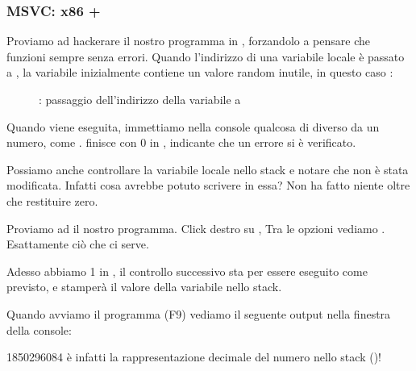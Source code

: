 \clearpage
\subsubsection{MSVC: x86 + \olly}

Proviamo ad hackerare il nostro programma in \olly, forzandolo a pensare che \scanf funzioni sempre senza errori.
Quando l'indirizzo di una variabile locale è passato a \scanf, la variabile inizialmente contiene un valore random inutile, in questo caso :

\begin{figure}[H]
\centering
{}
\caption{\olly: passaggio dell'indirizzo della variabile a \scanf}
\label{fig:scanf_ex3_olly_1}
\end{figure}

\clearpage
Quando \scanf viene eseguita, immettiamo nella console qualcosa di diverso da un numero, come .
\scanf finisce con 0 in \EAX, indicante che un errore si è verificato.

Possiamo anche controllare la variabile locale nello stack e notare che non è stata modificata.
Infatti cosa avrebbe potuto scrivere \scanf in essa? Non ha fatto niente oltre che restituire zero. 


Proviamo ad  il nostro programma.
Click destro su \EAX, 
Tra le opzioni vediamo .
Esattamente ciò che ci serve.

Adesso abbiamo 1 in \EAX, il controllo successivo sta per essere eseguito come previsto,
e \printf stamperà il valore della variabile nello stack.

Quando avviamo il programma (F9) vediamo il seguente output nella finestra della console:



1850296084 è infatti la rappresentazione decimale del numero nello stack ()!
